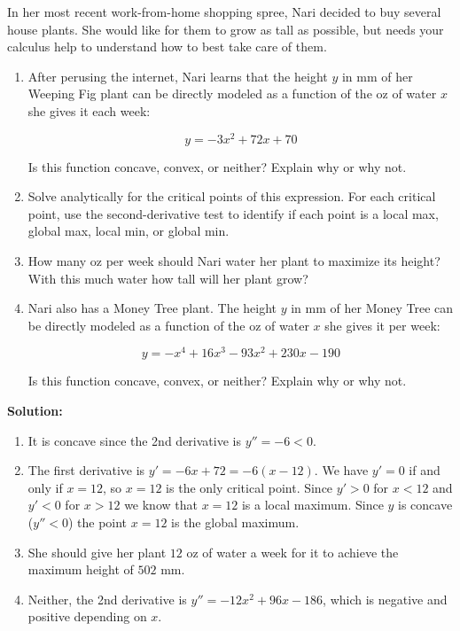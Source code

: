 \documentclass{harvardml}
\theoremstyle{definition}
\theoremstyle{plain}
\begin{document}
\begin{problem}

In her most recent work-from-home shopping spree, Nari decided to buy several house plants.  She would like for them to grow as tall as possible, but needs your calculus help to understand how to best take care of them.

\begin{enumerate} [label=(\alph*)] 
\item After perusing the internet, Nari learns that the height $y$ in mm of her Weeping Fig plant can be directly modeled as a function of the oz of water $x$ she gives it each week:



$$ y = - 3x^2 + 72x + 70$$

Is this function concave, convex, or neither?  Explain why or why not.

\item Solve analytically for the critical points of this expression.  For each critical point, use the second-derivative test to identify if each point is a local max, global max, local min, or global min. 

\item  How many oz per week should Nari water her plant to maximize its height? With this much water how tall will her plant grow?

\item Nari also has a Money Tree plant.  The height $y$ in mm of her Money Tree can be directly modeled as a function of the oz of water $x$ she gives it per week:

$$ y = - x^4 + 16 x^3 - 93 x^2 + 230 x - 190$$

Is this function concave, convex, or neither?  Explain why or why not.

\end{enumerate}

\noindent \textbf{Solution:}
\begin{enumerate}[label=(\alph*)]
    \item It is concave since the 2nd derivative is $y'' = -6 < 0$.
    \item The first derivative is $y' = -6x+72 = -6(x-12)$. We have $y' = 0$ if and only if $x = 12$, so $x=12$ is the only critical point. Since $y' > 0$ for $x < 12$ and $y' < 0$ for $x > 12$ we know that $x=12$ is a local maximum. Since $y$ is concave ($y'' < 0$) the point $x=12$ is the global maximum.
    \item She should give her plant $12$ oz of water a week for it to achieve the maximum height of $502$ mm.
    \item Neither, the 2nd derivative is $y'' = -12x^2 + 96x -186$, which is negative and positive depending on $x$.
\end{enumerate}


\end{problem}
        
\end{document}
